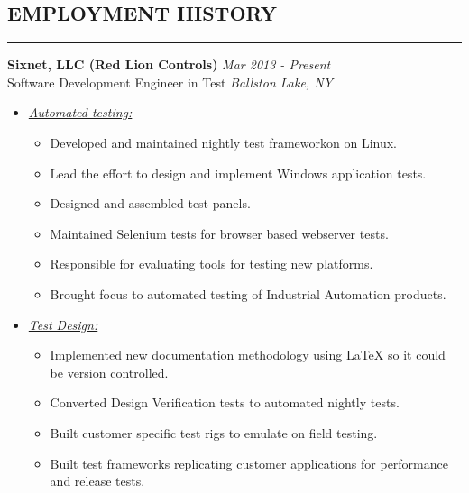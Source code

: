 \documentclass{article}
\begin{document}
\subsection*{\MakeUppercase{\bf Employment History}}
    \hrule
    \bigskip
    {\bf Sixnet, LLC (Red Lion Controls)} \hfill {\em Mar 2013 - Present} \\
    Software Development Engineer in Test \hfill {\em Ballston Lake, NY} \\
    \begin{itemize}
    \item \underline{\it Automated testing:}
          \begin{itemize}
          \item Developed and maintained nightly test frameworkon on Linux.
          \item Lead the effort to design and implement Windows application
                tests.
          \item Designed and assembled test panels.
          \item Maintained Selenium tests for browser based webserver tests.
          \item Responsible for evaluating tools for testing new platforms.
          \item Brought focus to automated testing of Industrial Automation
                products.
          \end{itemize}
    \item \underline{\it Test Design:}
          \begin{itemize}
          \item Implemented new documentation methodology using {\LaTeX} so
                it could be version controlled.
          \item Converted Design Verification tests to automated nightly tests.
          \item Built customer specific test rigs to emulate on field testing.
          \item Built test frameworks replicating customer applications for
                performance and release tests.
          \end{itemize}
    \end{itemize}
    \bigskip
\end{document}
